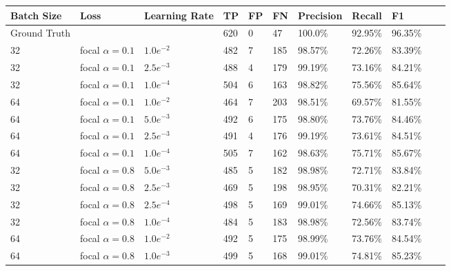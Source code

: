 \begin{table}
\footnotesize
\begin{center}
\begin{tabular}{|l|l|l|l|l|l|l|l|l|l|l|}

\hline
\textbf{Batch Size} & \textbf{Loss}      & \textbf{Learning Rate} & TP  & FP & FN  & Precision & Recall  & F1      \\
\hline
Ground Truth        &                    &                        & 620 & 0  & 47  & 100.0\%   & 92.95\% & 96.35\% \\
\hline
32                  & focal $\alpha=0.1$ & $1.0e^{-2}$            & 482 & 7  & 185 & 98.57\%   & 72.26\% & 83.39\% \\
\hline
32                  & focal $\alpha=0.1$ & $2.5e^{-3}$            & 488 & 4  & 179 & 99.19\%   & 73.16\% & 84.21\% \\
\hline
32                  & focal $\alpha=0.1$ & $1.0e^{-4}$            & 504 & 6  & 163 & 98.82\%   & 75.56\% & 85.64\% \\
\hline
64                  & focal $\alpha=0.1$ & $1.0e^{-2}$            & 464 & 7  & 203 & 98.51\%   & 69.57\% & 81.55\% \\
\hline
64                  & focal $\alpha=0.1$ & $5.0e^{-3}$            & 492 & 6  & 175 & 98.80\%   & 73.76\% & 84.46\% \\
\hline
64                  & focal $\alpha=0.1$ & $2.5e^{-3}$            & 491 & 4  & 176 & 99.19\%   & 73.61\% & 84.51\% \\
\hline
64                  & focal $\alpha=0.1$ & $1.0e^{-4}$            & 505 & 7  & 162 & 98.63\%   & 75.71\% & 85.67\% \\
\hline
32                  & focal $\alpha=0.8$ & $5.0e^{-3}$            & 485 & 5  & 182 & 98.98\%   & 72.71\% & 83.84\% \\
\hline
32                  & focal $\alpha=0.8$ & $2.5e^{-3}$            & 469 & 5  & 198 & 98.95\%   & 70.31\% & 82.21\% \\
\hline
32                  & focal $\alpha=0.8$ & $2.5e^{-4}$            & 498 & 5  & 169 & 99.01\%   & 74.66\% & 85.13\% \\
\hline
32                  & focal $\alpha=0.8$ & $1.0e^{-4}$            & 484 & 5  & 183 & 98.98\%   & 72.56\% & 83.74\% \\
\hline
64                  & focal $\alpha=0.8$ & $1.0e^{-2}$            & 492 & 5  & 175 & 98.99\%   & 73.76\% & 84.54\% \\
\hline
64                  & focal $\alpha=0.8$ & $1.0e^{-3}$            & 499 & 5  & 168 & 99.01\%   & 74.81\% & 85.23\% \\

\end{tabular}
\end{center}
\end{table}
